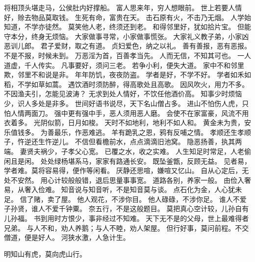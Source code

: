 \documentclass[12pt,UTF8]{ctexbook}
\begin{document}
将相顶头堪走马，公侯肚内好撑船。
富人思来年，穷人想眼前。
世上若要人情好，赊去物品莫取钱。
生死有命，富贵在天。
击石原有火，不击乃无烟。
人学始知道，不学亦徒然。
莫笑他人老，终须还到老。
和得邻里好，犹如拾片宝。
但能守本分，终身无烦恼。
大家做事寻常，小家做事慌张。
大家礼义教子弟，小家凶恶训儿郎。
君子爱财，取之有道。
贞妇爱色，纳之以礼。
善有善报，恶有恶报。
不是不报，时候未到。
万恶淫为首，百善孝当先。
人而无信，不知其可也。
一人道虚，千人传实。
凡事要好，须问三老。
若争小利，便失大道。
家中不和邻里欺，邻里不和说是非。
年年防饥，夜夜防盗。
学者是好，不学不好。
学者如禾如稻，不学如草如蒿。
遇饮酒时须防醉，得高歌处且高歌。
因风吹火，用力不多。
不因渔夫引，怎能见波涛？
无求到处人情好，不饮任他酒价高。
知事少时烦恼少，识人多处是非多。
世间好语书说尽，天下名山僧占多。
进山不怕伤人虎，只怕人情两面刀。
强中更有强中手，恶人须用恶人磨。
会使不在家富豪，风流不用衣着多。
光阴似箭，日月如梭。
天时不如地利，地利不如人和。
黄金未为贵，安乐值钱多。
为善最乐，作恶难逃。
羊有跪乳之恩，鸦有反哺之情。
孝顺还生孝顺子，忤逆还生忤逆儿。
不信但看檐前水，点点滴滴旧池窝。
隐恶扬善，执其两端。
妻贤夫祸少，子孝父心宽。
已覆之水，收之实难。
人生知足时常足，人老偷闲且是闲。
处处绿杨堪系马，家家有路通长安。
既坠釜甑，反顾无益。
见者易，学者难。莫将容易得，便作等闲看。
厌静还思喧，嫌喧又忆山。
自从心定后，无处不安然。
用心计较般般错，退后思量事事宽。
道路各别，养家一般。
由俭入奢易，从奢入俭难。
知音说与知音听，不是知音莫与谈。
点石化为金，人心犹未足。
信了赌，卖了屋。
他人观花，不涉你目。
他人碌碌，不涉你足。
谁人不爱子孙贤，谁人不爱千钟粟。
奈五行，不是这般题目。
莫把真心空计较，儿孙自有儿孙福。
书到用时方恨少，事非经过不知难。
天下无不是的父母，世上最难得者兄弟。
与人不和，劝人养鹅；与人不睦，劝人架屋。
但行好事，莫问前程。不交僧道，便是好人。
河狭水激，人急计生。

明知山有虎，莫向虎山行。
\end{document}
